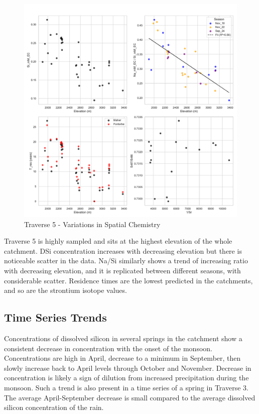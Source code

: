 \begin{figure}[h]
    \centering
        \includegraphics[width=\textwidth]{Traverse_5_summary.pdf}
    \caption{Traverse 5 - Variations in Spatial Chemistry}
    \label{fig:spatial_changes_spring5}
\end{figure}

\FloatBarrier

Traverse 5 is highly sampled and sits at the highest elevation of the whole catchment. DSi concentration increases with decreasing elevation but there is noticeable scatter in the data. Na/Si similarly shows a trend of increasing ratio with decreasing elevation, and it is replicated between different seasons, with considerable scatter. Residence times are the lowest predicted in the catchments, and so are the strontium isotope values.


\subsection{Time Series Trends}

Concentrations of dissolved silicon in several springs in the catchment show a consistent decrease in concentration with the onset of the monsoon. Concentrations are high in April, decrease to a minimum in September, then slowly increase back to April levels through October and November. Decrease in concentration is likely a sign of dilution from increased precipitation during the monsoon. Such a trend is also present in a time series of a spring in Traverse 3. The average April-September decrease is small compared to the average dissolved silicon concentration of the rain.


